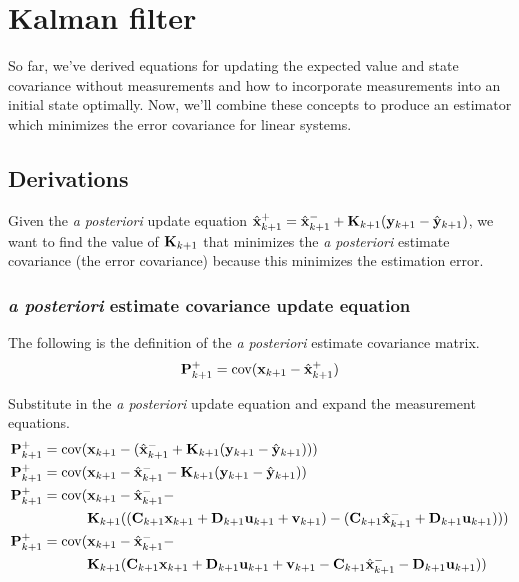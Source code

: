 \section{Kalman filter}

So far, we've derived equations for updating the expected value and state
covariance without measurements and how to incorporate measurements into an
initial \gls{state} optimally. Now, we'll combine these concepts to produce an
estimator which minimizes the error covariance for linear \glspl{system}.

\subsection{Derivations}

Given the \textit{a posteriori} update equation
$\hat{\mathbf{x}}_{k+1}^+ = \hat{\mathbf{x}}_{k+1}^- + \mathbf{K}_{k+1}(\mathbf{y}_{k+1} -
\hat{\mathbf{y}}_{k+1})$, we want to find the value of $\mathbf{K}_{k+1}$ that
minimizes the \textit{a posteriori} estimate covariance (the error covariance)
because this minimizes the estimation error.

\subsubsection{\textit{a posteriori} estimate covariance update equation}

The following is the definition of the \textit{a posteriori} estimate covariance
matrix.
\begin{equation*}
  \mathbf{P}_{k+1}^+ = \operatorname{cov}(\mathbf{x}_{k+1} - \hat{\mathbf{x}}_{k+1}^+)
\end{equation*}

Substitute in the \textit{a posteriori} update equation and expand the
measurement equations.
\begin{align*}
  \mathbf{P}_{k+1}^+ = \operatorname{cov}(&\mathbf{x}_{k+1} - (\hat{\mathbf{x}}_{k+1}^- +
    \mathbf{K}_{k+1}(\mathbf{y}_{k+1} - \hat{\mathbf{y}}_{k+1}))) \\
  \mathbf{P}_{k+1}^+ = \operatorname{cov}(&\mathbf{x}_{k+1} - \hat{\mathbf{x}}_{k+1}^- -
    \mathbf{K}_{k+1}(\mathbf{y}_{k+1} - \hat{\mathbf{y}}_{k+1})) \\
  \mathbf{P}_{k+1}^+ = \operatorname{cov}(&\mathbf{x}_{k+1} - \hat{\mathbf{x}}_{k+1}^- - \\
    &\mathbf{K}_{k+1}((\mathbf{C}_{k+1} \mathbf{x}_{k+1} + \mathbf{D}_{k+1} \mathbf{u}_{k+1} +
      \mathbf{v}_{k+1}) - (\mathbf{C}_{k+1} \hat{\mathbf{x}}_{k+1}^- +
      \mathbf{D}_{k+1}\mathbf{u}_{k+1}))) \\
  \mathbf{P}_{k+1}^+ = \operatorname{cov}(&\mathbf{x}_{k+1} - \hat{\mathbf{x}}_{k+1}^- - \\
    &\mathbf{K}_{k+1}(\mathbf{C}_{k+1} \mathbf{x}_{k+1} + \mathbf{D}_{k+1} \mathbf{u}_{k+1} +
      \mathbf{v}_{k+1} - \mathbf{C}_{k+1} \hat{\mathbf{x}}_{k+1}^- -
      \mathbf{D}_{k+1}\mathbf{u}_{k+1}))
\end{align*}

